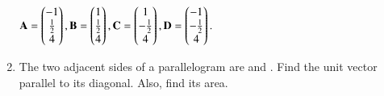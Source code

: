 \begin{enumerate}[label=\arabic*.,ref=\thesubsection.\theenumi]
$\mathbf{A} = \begin{pmatrix}-1\\\frac{1}{2}\\ 4\end{pmatrix},
 \mathbf{B} = \begin{pmatrix}1\\\frac{1}{2}\\ 4\end{pmatrix},
\mathbf{C} = \begin{pmatrix}1\\-\frac{1}{2}\\ 4\end{pmatrix},
\mathbf{D} = \begin{pmatrix}-1\\-\frac{1}{2}\\ 4\end{pmatrix}.
$
\item The two adjacent sides of a parallelogram are  and  . Find the unit vector parallel to its diagonal.  Also, find its area.
%
%
\end{enumerate}
%
